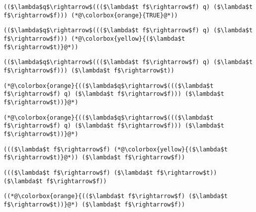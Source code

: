 \documentclass{beamer}
\begin{document}
\begin{frame}[fragile]{\CurrentSection}
\lstset{basicstyle=\ttfamily\small}\lstset{numbers=none}\lstset{language=ML}\begin{lstlisting}
(($\lambda$q$\rightarrow$((($\lambda$t f$\rightarrow$f) q) ($\lambda$t f$\rightarrow$f))) (*@\colorbox{orange}{TRUE}@*))
\end{lstlisting}
\pause\lstset{language=ML}\begin{lstlisting}
(($\lambda$q$\rightarrow$((($\lambda$t f$\rightarrow$f) q) ($\lambda$t f$\rightarrow$f))) (*@\colorbox{yellow}{($\lambda$t f$\rightarrow$t)}@*))
\end{lstlisting}

\end{frame}

\begin{frame}[fragile]{\CurrentSection}
\lstset{basicstyle=\ttfamily\small}\lstset{numbers=none}\lstset{language=ML}\begin{lstlisting}
(($\lambda$q$\rightarrow$((($\lambda$t f$\rightarrow$f) q) ($\lambda$t f$\rightarrow$f))) ($\lambda$t f$\rightarrow$t))
\end{lstlisting}
\pause\lstset{language=ML}\begin{lstlisting}
(*@\colorbox{orange}{(($\lambda$q$\rightarrow$((($\lambda$t f$\rightarrow$f) q) ($\lambda$t f$\rightarrow$f))) ($\lambda$t f$\rightarrow$t))}@*)
\end{lstlisting}

\end{frame}

\begin{frame}[fragile]{\CurrentSection}
\lstset{basicstyle=\ttfamily\small}\lstset{numbers=none}\lstset{language=ML}\begin{lstlisting}
(*@\colorbox{orange}{(($\lambda$q$\rightarrow$((($\lambda$t f$\rightarrow$f) q) ($\lambda$t f$\rightarrow$f))) ($\lambda$t f$\rightarrow$t))}@*)
\end{lstlisting}
\pause\lstset{language=ML}\begin{lstlisting}
((($\lambda$t f$\rightarrow$f) (*@\colorbox{yellow}{($\lambda$t f$\rightarrow$t)}@*)) ($\lambda$t f$\rightarrow$f))
\end{lstlisting}

\end{frame}

\begin{frame}[fragile]{\CurrentSection}
\lstset{basicstyle=\ttfamily\small}\lstset{numbers=none}\lstset{language=ML}\begin{lstlisting}
((($\lambda$t f$\rightarrow$f) ($\lambda$t f$\rightarrow$t)) ($\lambda$t f$\rightarrow$f))
\end{lstlisting}
\pause\lstset{language=ML}\begin{lstlisting}
((*@\colorbox{orange}{(($\lambda$t f$\rightarrow$f) ($\lambda$t f$\rightarrow$t))}@*) ($\lambda$t f$\rightarrow$f))
\end{lstlisting}

\end{frame}
\end{document}
